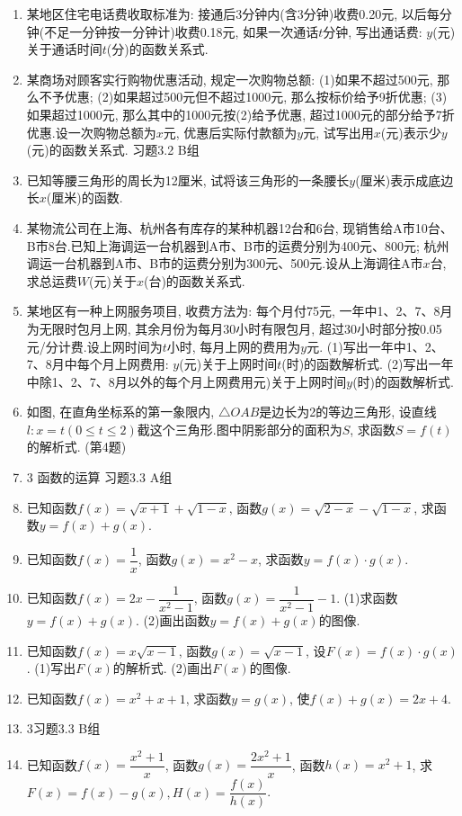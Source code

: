 \documentclass[10pt,a4paper]{article}
\begin{document}
\begin{enumerate}[1.]
\item 某地区住宅电话费收取标准为: 接通后3分钟内(含3分钟)收费0.20元, 以后每分钟(不足一分钟按一分钟计)收费0.18元, 如果一次通话$t$分钟, 写出通话费: $y$(元)关于通话时间$t$(分)的函数关系式.
\item 某商场对顾客实行购物优惠活动, 规定一次购物总额: (1)如果不超过500元, 那么不予优惠; (2)如果超过500元但不超过1000元, 那么按标价给予9折优惠; (3)如果超过1000元, 那么其中的1000元按(2)给予优惠, 超过1000元的部分给予7折优惠.设一次购物总额为$x$元, 优惠后实际付款额为$y$元, 试写出用$x$(元)表示少$y$(元)的函数关系式.
习题3.2  B组
\item 已知等腰三角形的周长为12厘米, 试将该三角形的一条腰长$y$(厘米)表示成底边长$x$(厘米)的函数.
\item 某物流公司在上海、杭州各有库存的某种机器12台和6台, 现销售给A市10台、B市8台.已知上海调运一台机器到A市、B市的运费分别为400元、800元; 杭州调运一台机器到A市、B市的运费分别为300元、500元.设从上海调往A市$x$台, 求总运费$W$(元)关于$x$(台)的函数关系式.
\item 某地区有一种上网服务项目, 收费方法为: 每个月付75元, 一年中1、2、7、8月为无限时包月上网, 其余月份为每月30小时有限包月, 超过30小时部分按0.05元/分计费.设上网时间为$t$小时, 每月上网的费用为$y$元.
(1)写出一年中1、2、7、8月中每个月上网费用: $y$(元)关于上网时间$t$(时)的函数解析式.
(2)写出一年中除1、2、7、8月以外的每个月上网费用元)关于上网时间$y$(时)的函数解析式.
\item 如图, 在直角坐标系的第一象限内, $\triangle OAB$是边长为2的等边三角形, 设直线$l:x=t(0\le t\le 2)$截这个三角形.图中阴影部分的面积为$S$, 求函数$S=f(t)$的解析式.
(第4题)
\item 3  函数的运算
习题3.3  A组
\item 已知函数$f(x)=\sqrt {x+1}+\sqrt {1-x}$, 函数$g(x)=\sqrt {2-x}-\sqrt {1-x}$, 求函数$y=f(x)+g(x)$.
\item 已知函数$f(x)=\dfrac 1x$, 函数$g(x)=x^2-x$, 求函数$y=f(x)\cdot g(x)$.
\item 已知函数$f(x)=2x-\dfrac 1{x^2-1}$, 函数$g(x)=\dfrac 1{x^2-1}-1$.
(1)求函数$y=f(x)+g(x)$.
(2)画出函数$y=f(x)+g(x)$的图像.
\item 已知函数$f(x)=x\sqrt {x-1}$, 函数$g(x)=\sqrt {x-1}$, 设$F(x)=f(x)\cdot g(x)$.
(1)写出$F(x)$的解析式.
(2)画出$F(x)$的图像.
\item 已知函数$f(x)=x^2+x+1$, 求函数$y=g(x)$, 使$f(x)+g(x)=2x+4$.
\item 3习题3.3  B组
\item 已知函数$f(x)=\dfrac{x^2+1}x$, 函数$g(x)=\dfrac{2x^2+1}x$, 函数$h(x)=x^2+1$, 求$F(x)=f(x)-g(x),H(x)=\dfrac{f(x)}{h(x)}$.

\end{enumerate}
\end{document}
